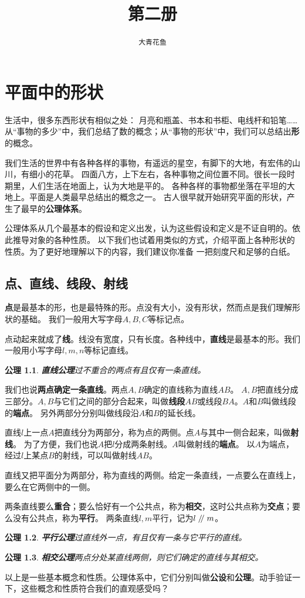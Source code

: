 \documentclass[12pt,UTF8]{ctexbook}
\title{\zihao{0} \bfseries 第二册}
\author{\zihao{2} \texttt{大青花鱼}}
\date{}
\newtheorem{po}{公理}
\renewcommand\parallel{\mathrel{/\mskip-4mu/}}
\begin{document}
\maketitle
\tableofcontents
\newpage

\chapter{平面中的形状}

生活中，很多东西形状有相似之处：
月亮和瓶盖、书本和书柜、电线杆和铅笔……
从“事物的多少”中，我们总结了数的概念；从“事物的形状”中，我们可以总结出\textbf{形}的概念。

我们生活的世界中有各种各样的事物，有遥远的星空，有脚下的大地，有宏伟的山川，有细小的花草。
四面八方，上下左右，各种事物之间位置不同。很长一段时期里，人们生活在地面上，认为大地是平的。
各种各样的事物都坐落在平坦的大地上。平面是人类最早总结出的概念之一。
古人很早就开始研究平面的形状，产生了最早的\textbf{公理体系}。

公理体系从几个最基本的假设和定义出发，认为这些假设和定义是不证自明的。依此推导对象的各种性质。
以下我们也试着用类似的方式，介绍平面上各种形状的性质。为了更好地理解以下的内容，我们建议你准备
一把刻度尺和足够的白纸。

\section{点、直线、线段、射线}
\textbf{点}是最基本的形，也是最特殊的形。点没有大小，没有形状，然而点是我们理解形状的基础。
我们一般用大写字母$A,B,C$等标记点。

点动起来就成了\textbf{线}。线没有宽度，只有长度。各种线中，\textbf{直线}是最基本的形。我们一般用小写字母$l,m,n$等标记直线。
\begin{po}{\textbf{直线公理}}\label{po:0}
    过不重合的两点有且仅有一条直线。
\end{po}
我们也说\textbf{两点确定一条直线}。两点$A,B$确定的直线称为直线$AB$。
$A,B$把直线分成三部分。$A,B$与它们之间的部分合起来，叫做\textbf{线段}$AB$或线段$BA$。$A$和$B$叫做线段的\textbf{端点}。
另外两部分分别叫做线段沿$A$和$B$的延长线。

直线$l$上一点$A$把直线分为两部分，称为点的两侧。点$A$与其中一侧合起来，叫做\textbf{射线}。
为了方便，我们也说$A$把$l$分成两条射线。$A$叫做射线的\textbf{端点}。
以$A$为端点，经过$l$上某点$B$的射线，可以叫做射线$AB$。

直线又把平面分为两部分，称为直线的两侧。给定一条直线，一点要么在直线上，要么在它两侧中的一侧。

两条直线要么\textbf{重合}；要么恰好有一个公共点，称为\textbf{相交}，这时公共点称为\textbf{交点}；要么没有公共点，称为\textbf{平行}。
两条直线$l,m$平行，记为$l \parallel m$。
\begin{po}{\textbf{平行公理}}\label{po:1}
    过直线外一点，有且仅有一条与它平行的直线。
\end{po}
\begin{po}{\textbf{相交公理}}\label{po:2}
    两点分处某直线两侧，则它们确定的直线与其相交。
\end{po}
以上是一些基本概念和性质。公理体系中，它们分别叫做\textbf{公设}和\textbf{公理}。动手验证一下，这些概念和性质符合我们的直观感受吗？
\end{document}
